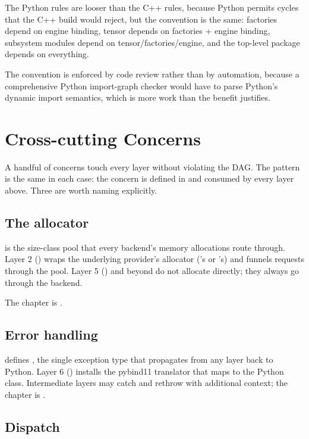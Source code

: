 The Python rules are looser than the C++ rules, because Python
permits cycles that the C++ build would reject, but the convention
is the same: factories depend on engine binding, tensor depends on
factories + engine binding, subsystem modules depend on
tensor/factories/engine, and the top-level package depends on
everything.

The convention is enforced by code review rather than by automation,
because a comprehensive Python import-graph checker would have to
parse Python's dynamic import semantics, which is more work than
the benefit justifies.

\section{Cross-cutting Concerns}
\label{sec:layered_dag:crosscutting}

A handful of concerns touch every layer without violating the DAG.
The pattern is the same in each case: the concern is defined in
 and consumed by every layer above. Three are worth
naming explicitly.

\subsection{The allocator}
\label{ssec:layered_dag:allocator_xc}

 is the size-class pool that every backend's
memory allocations route through. Layer 2 () wraps
the underlying provider's allocator (\MLX's or \Accelerate's) and
funnels requests through the pool. Layer 5 () and beyond
do not allocate directly; they always go through the backend.

The chapter is .

\subsection{Error handling}
\label{ssec:layered_dag:errors_xc}

 defines , the single exception
type that propagates from any layer back to Python. Layer 6
() installs the pybind11 translator that maps
 to the Python  class.
Intermediate layers may catch and rethrow with additional context;
the chapter is .

\subsection{Dispatch}
\label{ssec:layered_dag:dispatch_xc}

